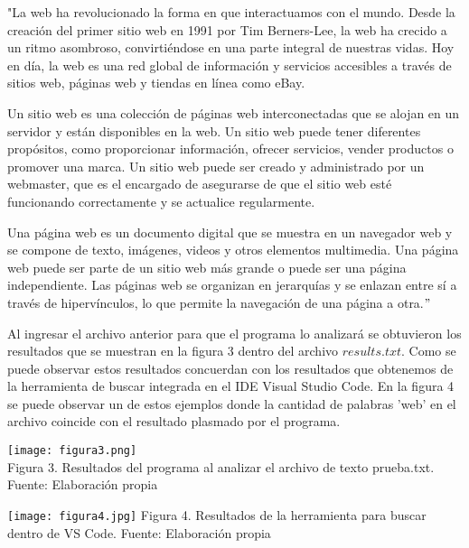 \documentclass{article}
\begin{document}
	\begin{center}
		\begin{minipage}{.9\linewidth}
			\vspace{2pt}
			{\small
				"La web ha revolucionado la forma en que interactuamos con el mundo. Desde la creación del primer sitio web en 1991 por Tim Berners-Lee, la web ha crecido a un ritmo asombroso, convirtiéndose en una parte integral de nuestras vidas. Hoy en día, la web es una red global de información y servicios accesibles a través de sitios web, páginas web y tiendas en línea como eBay.
				
				Un sitio web es una colección de páginas web interconectadas que se alojan en un servidor y están disponibles en la web. Un sitio web puede tener diferentes propósitos, como proporcionar información, ofrecer servicios, vender productos o promover una marca. Un sitio web puede ser creado y administrado por un webmaster, que es el encargado de asegurarse de que el sitio web esté funcionando correctamente y se actualice regularmente.
				
				Una página web es un documento digital que se muestra en un navegador web y se compone de texto, imágenes, videos y otros elementos multimedia. Una página web puede ser parte de un sitio web más grande o puede ser una página independiente. Las páginas web se organizan en jerarquías y se enlazan entre sí a través de hipervínculos, lo que permite la navegación de una página a otra.$"$         
			}        
			\vspace{5pt}
		\end{minipage}
	\end{center}
	
	Al ingresar el archivo anterior para que el programa lo analizará se obtuvieron los resultados que se muestran en la figura 3 dentro del archivo $results.txt$. Como se puede observar estos resultados concuerdan con los resultados que obtenemos de la herramienta de buscar integrada en el IDE Visual Studio Code. En la figura 4 se puede observar un de estos ejemplos donde la cantidad de palabras 'web' en el archivo coincide con el resultado plasmado por el programa.
	
	\begin{center}
		\texttt{[image: figura3.png]}
		\small \\Figura 3. Resultados del programa al analizar el archivo de texto prueba.txt. Fuente: Elaboración propia
	\end{center}
	
	\begin{center}
		\texttt{[image: figura4.jpg]}
		\small Figura 4. Resultados de la herramienta para buscar dentro de VS Code. Fuente: Elaboración propia
	\end{center}
	
\end{document}
